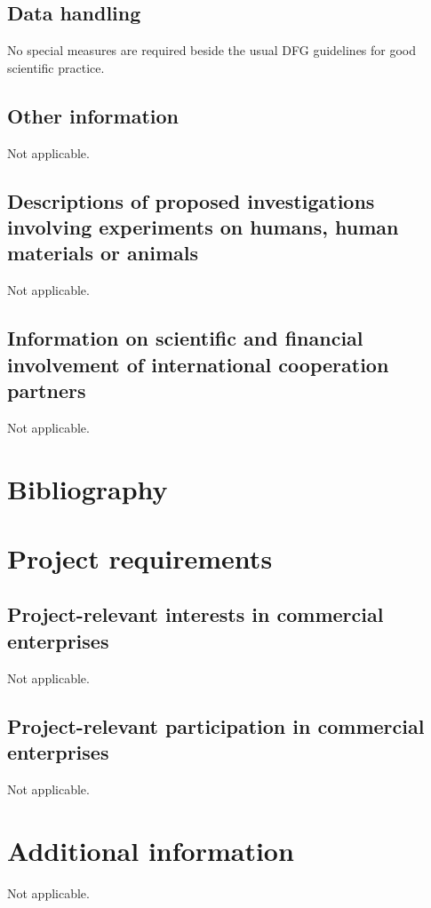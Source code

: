 \documentclass[11pt,a4paper]{scrartcl}
\begin{document}


\setcounter{page}{1}
\vspace{6pt}







\subsection{Data handling}
No special measures are required beside the usual DFG guidelines for good scientific practice.

\subsection{Other information}
Not applicable.

\vspace{-2mm}
\subsection{Descriptions of proposed investigations involving experiments on humans, human materials or animals}
Not applicable.

\vspace{-2mm}
\subsection{Information on scientific and financial involvement of international cooperation partners}
Not applicable.

\vspace{-2mm}
\section{Bibliography}

\begingroup
\renewcommand*{\bibfont}{\footnotesize}
\setlength\bibitemsep{0pt}
\sloppy
\printbibliography[heading=empty,notcategory=groupA,notcategory=groupB, notcategory=pat] %
\endgroup

\vspace{-2mm}


\section{Project requirements}




\subsection{Project-relevant interests in commercial enterprises}
Not applicable.

\subsection{Project-relevant participation in commercial enterprises}
Not applicable.

\section{Additional information}
Not applicable.
\end{document}
